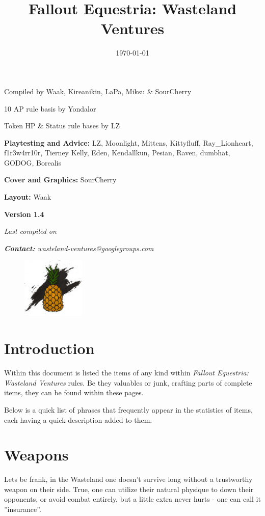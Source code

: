 \documentclass[11pt,a4paper,twocolumn]{book}
\title{Fallout Equestria: Wasteland Ventures}
\date{\today}
\begin{document}
	
%		
	\onecolumn	
	\setcounter{page}{1}
	\begin{center}
		Compiled by Waak, Kireanikin, LaPa, Miksu \& SourCherry
		
		10 AP rule basis by Yondalor
		
		Token HP \& Status rule bases by LZ
		
		\bigskip		
		\textbf{Playtesting and Advice:} LZ, Moonlight, Mittens, Kittyfluff, Ray\_Lionheart, f1r3w4rr10r, Tierney Kelly, Eden, Kendallkun, Pesian, Raven, dumbhat, GODOG, Borealis
		
		\bigskip
		\textbf{Cover and Graphics:} SourCherry
		
		\bigskip
		\textbf{Layout:} Waak
	\end{center}
	
	\vfill
	
	\begin{center}
		\textbf{Version 1.4}
		
		\emph{Last compiled on \thedate}
        
        \emph{\textbf{Contact:} wasteland-ventures@googlegroups.com}
	\end{center}	

	\begin{figure}[bp]
		\centering
		\includegraphics[width=3cm]{Art/ISA_Logo}
		\label{fig:isalogo}
	\end{figure}

	\tableofcontents
	
	\chapter{Introduction}
	\noindent
	Within this document is listed the items of any kind within \emph{Fallout Equestria: Wasteland Ventures} rules. Be they valuables or junk, crafting parts of complete items, they can be found within these pages.
	
	Below is a quick list of phrases that frequently appear in the statistics of items, each having a quick description added to them.
	
	\chapter{Weapons}
	\noindent
	Lets be frank, in the Wasteland one doesn't survive long without a trustworthy weapon on their side. True, one can utilize their natural physique to down their opponents, or avoid combat entirely, but a little extra never hurts - one can call it ''insurance''.	
	
\end{document}
